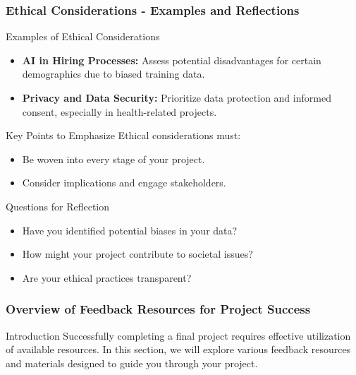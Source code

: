 \documentclass{beamer}
\begin{document}
\begin{frame}[fragile]
    \frametitle{Ethical Considerations - Examples and Reflections}
    \begin{block}{Examples of Ethical Considerations}
        \begin{itemize}
            \item \textbf{AI in Hiring Processes:} Assess potential disadvantages for certain demographics due to biased training data.
            \item \textbf{Privacy and Data Security:} Prioritize data protection and informed consent, especially in health-related projects.
        \end{itemize}
    \end{block}

    \begin{block}{Key Points to Emphasize}
        Ethical considerations must:
        \begin{itemize}
            \item Be woven into every stage of your project.
            \item Consider implications and engage stakeholders.
        \end{itemize}
    \end{block}

    \begin{block}{Questions for Reflection}
        \begin{itemize}
            \item Have you identified potential biases in your data?
            \item How might your project contribute to societal issues?
            \item Are your ethical practices transparent?
        \end{itemize}
    \end{block}
\end{frame}

\begin{frame}[fragile]
    \frametitle{Overview of Feedback Resources for Project Success}
    \begin{block}{Introduction}
        Successfully completing a final project requires effective utilization of available resources. 
        In this section, we will explore various feedback resources and materials designed to guide you through your project.
    \end{block}
\end{frame}
\end{document}
